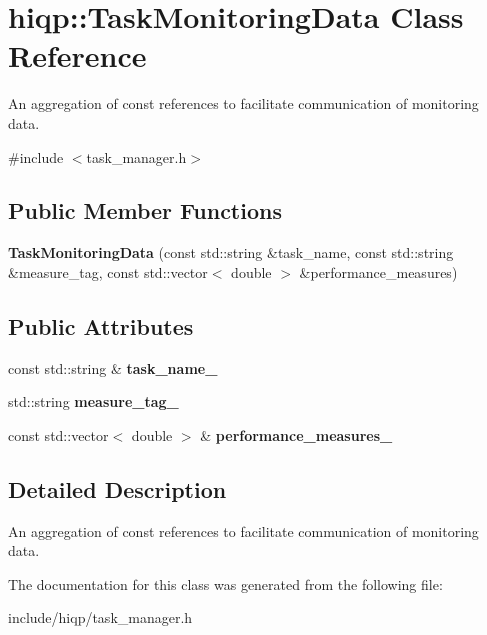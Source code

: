 \hypertarget{classhiqp_1_1TaskMonitoringData}{\section{hiqp\-:\-:Task\-Monitoring\-Data Class Reference}
\label{classhiqp_1_1TaskMonitoringData}
}


An aggregation of const references to facilitate communication of monitoring data.  




{\ttfamily \#include $<$task\-\_\-manager.\-h$>$}

\subsection*{Public Member Functions}
\begin{DoxyCompactItemize}
\item 
\hypertarget{classhiqp_1_1TaskMonitoringData_a33f6baf4d20a2ef1a7e89e4e7ea3ef7b}{{\bfseries Task\-Monitoring\-Data} (const std\-::string \&task\-\_\-name, const std\-::string \&measure\-\_\-tag, const std\-::vector$<$ double $>$ \&performance\-\_\-measures)}\label{classhiqp_1_1TaskMonitoringData_a33f6baf4d20a2ef1a7e89e4e7ea3ef7b}

\end{DoxyCompactItemize}
\subsection*{Public Attributes}
\begin{DoxyCompactItemize}
\item 
\hypertarget{classhiqp_1_1TaskMonitoringData_a51d485d0b298dd0e4859744cf33a8227}{const std\-::string \& {\bfseries task\-\_\-name\-\_\-}}\label{classhiqp_1_1TaskMonitoringData_a51d485d0b298dd0e4859744cf33a8227}

\item 
\hypertarget{classhiqp_1_1TaskMonitoringData_af27f6d903e69473949feb16e2e82cd69}{std\-::string {\bfseries measure\-\_\-tag\-\_\-}}\label{classhiqp_1_1TaskMonitoringData_af27f6d903e69473949feb16e2e82cd69}

\item 
\hypertarget{classhiqp_1_1TaskMonitoringData_a693c5b1df002e1558df125f268057e91}{const std\-::vector$<$ double $>$ \& {\bfseries performance\-\_\-measures\-\_\-}}\label{classhiqp_1_1TaskMonitoringData_a693c5b1df002e1558df125f268057e91}

\end{DoxyCompactItemize}


\subsection{Detailed Description}
An aggregation of const references to facilitate communication of monitoring data. 

The documentation for this class was generated from the following file\-:\begin{DoxyCompactItemize}
\item 
include/hiqp/task\-\_\-manager.\-h\end{DoxyCompactItemize}
